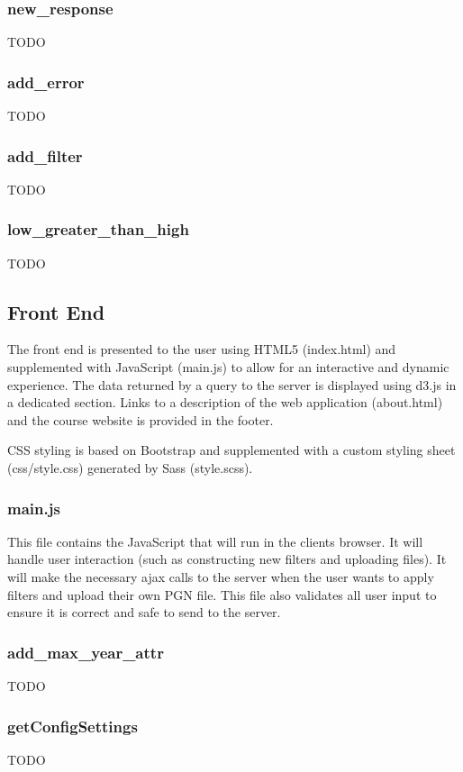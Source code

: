 \documentclass{article}
\begin{document}
\subsubsection*{new\_response}
TODO

\subsubsection*{add\_error}
TODO

\subsubsection*{add\_filter}
TODO

\subsubsection*{low\_greater\_than\_high}
TODO


\subsection{Front End}

The front end is presented to the user using HTML5 (index.html) and supplemented with JavaScript (main.js) to allow for an interactive and dynamic experience.  The data returned by a query to the server is displayed using d3.js in a dedicated section.  Links to a description of the web application (about.html) and the course
website is provided in the footer.

CSS styling is based on Bootstrap and supplemented with a custom styling sheet (css/style.css) generated by Sass (style.scss).


\subsubsection{main.js}
This file contains the JavaScript that will run in the clients browser. It will handle user interaction (such as constructing new filters and uploading files). It will make the necessary ajax calls to the server when the user wants to apply filters and upload their own PGN file. This file also validates all user input to ensure it is correct and safe to send to the server.


\subsubsection*{add\_max\_year\_attr}
TODO


\subsubsection*{getConfigSettings}
TODO
\end{document}
